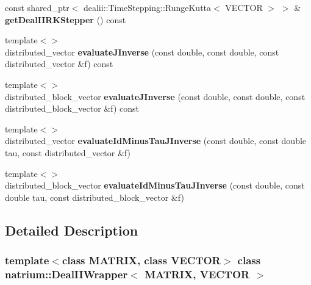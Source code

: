\begin{DoxyCompactItemize}
\item 
\hypertarget{classnatrium_1_1DealIIWrapper_ad5a2afa2b03697767272036a6acd51ff}{
const shared\_\-ptr$<$ dealii::TimeStepping::RungeKutta$<$ VECTOR $>$ $>$ \& {\bfseries getDealIIRKStepper} () const }
\label{classnatrium_1_1DealIIWrapper_ad5a2afa2b03697767272036a6acd51ff}

\item 
\hypertarget{classnatrium_1_1DealIIWrapper_ad9f669169c770a15fc9edf5e93030b1f}{
{\footnotesize template$<$$>$ }\\distributed\_\-vector {\bfseries evaluateJInverse} (const double, const double, const distributed\_\-vector \&f) const}
\label{classnatrium_1_1DealIIWrapper_ad9f669169c770a15fc9edf5e93030b1f}

\item 
\hypertarget{classnatrium_1_1DealIIWrapper_a43b19df161e01db3b99489877eaf6451}{
{\footnotesize template$<$$>$ }\\distributed\_\-block\_\-vector {\bfseries evaluateJInverse} (const double, const double, const distributed\_\-block\_\-vector \&f) const}
\label{classnatrium_1_1DealIIWrapper_a43b19df161e01db3b99489877eaf6451}

\item 
\hypertarget{classnatrium_1_1DealIIWrapper_ab0e57073c150e04e063dc621bf9b94f5}{
{\footnotesize template$<$$>$ }\\distributed\_\-vector {\bfseries evaluateIdMinusTauJInverse} (const double, const double tau, const distributed\_\-vector \&f)}
\label{classnatrium_1_1DealIIWrapper_ab0e57073c150e04e063dc621bf9b94f5}

\item 
\hypertarget{classnatrium_1_1DealIIWrapper_aea3a4ef30de64fa1c771ff8df4a7c358}{
{\footnotesize template$<$$>$ }\\distributed\_\-block\_\-vector {\bfseries evaluateIdMinusTauJInverse} (const double, const double tau, const distributed\_\-block\_\-vector \&f)}
\label{classnatrium_1_1DealIIWrapper_aea3a4ef30de64fa1c771ff8df4a7c358}

\end{DoxyCompactItemize}


\subsection{Detailed Description}
\subsubsection*{template$<$class MATRIX, class VECTOR$>$ class natrium::DealIIWrapper$<$ MATRIX, VECTOR $>$}

